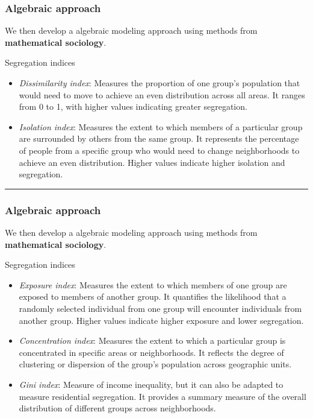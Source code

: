 \documentclass[
  letterpaper,
  DIV=11,
  numbers=noendperiod]{scrartcl}
\begin{document}
\hypertarget{algebraic-approach}{%
\subsubsection{Algebraic approach}\label{algebraic-approach}}

We then develop a algebraic modeling approach using methods from
\textbf{mathematical sociology}.

Segregation indices

\begin{itemize}
\item
  \emph{Dissimilarity index}: Measures the proportion of one group's
  population that would need to move to achieve an even distribution
  across all areas. It ranges from 0 to 1, with higher values indicating
  greater segregation.
\item
  \emph{Isolation index}: Measures the extent to which members of a
  particular group are surrounded by others from the same group. It
  represents the percentage of people from a specific group who would
  need to change neighborhoods to achieve an even distribution. Higher
  values indicate higher isolation and segregation.
\end{itemize}

\begin{center}\rule{0.5\linewidth}{0.5pt}\end{center}

\hypertarget{algebraic-approach-1}{%
\subsubsection{Algebraic approach}\label{algebraic-approach-1}}

We then develop a algebraic modeling approach using methods from
\textbf{mathematical sociology}.

Segregation indices

\begin{itemize}
\item
  \emph{Exposure index}: Measures the extent to which members of one
  group are exposed to members of another group. It quantifies the
  likelihood that a randomly selected individual from one group will
  encounter individuals from another group. Higher values indicate
  higher exposure and lower segregation.
\item
  \emph{Concentration index}: Measures the extent to which a particular
  group is concentrated in specific areas or neighborhoods. It reflects
  the degree of clustering or dispersion of the group's population
  across geographic units.
\item
  \emph{Gini index}: Measure of income inequality, but it can also be
  adapted to measure residential segregation. It provides a summary
  measure of the overall distribution of different groups across
  neighborhoods.
\end{itemize}
\end{document}

